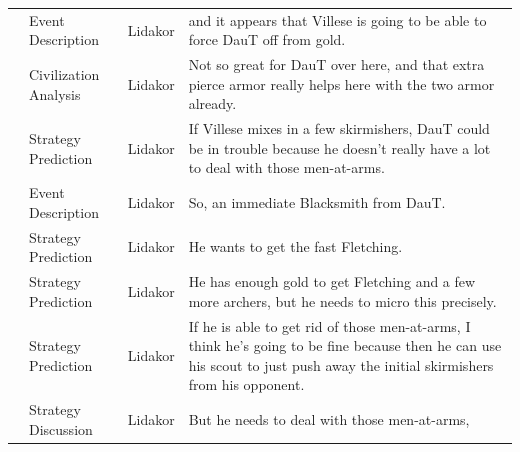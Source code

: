 {\begin{longtable}{@{}>{\theAppRow}r|L{2.3cm}L{1.0cm}U{11.55cm}@{}}
    & Event Description     & Lidakor & and it appears that Villese is going to be able to force DauT off from gold.                                                                                                                                                                                                                    \\
    & Civilization Analysis & Lidakor & Not so great for DauT over here, and that extra pierce armor really helps here with the two armor already.                                                                                                                                                                                      \\
    & Strategy Prediction   & Lidakor & If Villese mixes in a few skirmishers, DauT could be in trouble because he doesn't really have a lot to deal with those men-at-arms.                                                                                                                                                            \\
    & Event Description     & Lidakor & So, an immediate Blacksmith from DauT.                                                                                                                                                                                                                                                          \\
    & Strategy Prediction   & Lidakor & He wants to get the fast Fletching.                                                                                                                                                                                                                                                             \\
    & Strategy Prediction   & Lidakor & He has enough gold to get Fletching and a few more archers, but he needs to micro this precisely.                                                                                                                                                                                               \\
    & Strategy Prediction   & Lidakor & If he is able to get rid of those men-at-arms, I think he's going to be fine because then he can use his scout to just push away the initial skirmishers from his opponent.                                                                                                                     \\
    & Strategy Discussion   & Lidakor & But he needs to deal with those men-at-arms,                                                                                                                                                                                                                                                    \\

\end{longtable}}
